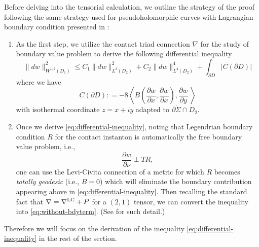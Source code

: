 \documentclass[reqno]{amsart}
\newcommand{\del}{\partial}
\newcommand{\be}{\begin{equation}}
\newcommand{\ee}{\end{equation}}
\theoremstyle{theorem}
\theoremstyle{definition}
\numberwithin{equation}{section}
\begin{document}
Before delving into the tensorial calculation, we outline the strategy of the proof
following the same strategy used for  pseudoholomorphic curves with Lagrangian boundary condition
presented in \cite[Section 8.2 \& 8.3]{oh:book1}:
\begin{enumerate}
\item As the first step, we utilize the contact triad connection $\nabla$ for the study of
boundary value problem to derive the following differential inequality
\be\label{eq:differential-inequality}
\|dw\|^2_{W^{1,2}(D_1)} \leq  C_1 \|dw\|^2_{L^2(D_2)} + C_2 \|dw\|^4_{L^4(D_2)}
+ \int_{\del D}|C(\del D)|
\ee
where we have
\be\label{eq;CdelD}
C(\del D): = - 8\left\langle B\left(\frac{\del w}{\del x},\frac{\del w}{\del x}\right),\frac{\del w}{\del y}\
\right \rangle
\ee
with isothermal coordinate $z = x+ iy$ adapted to $\del \dot \Sigma \cap D_2$.
\item Once we derive \eqref{eq:differential-inequality}, noting that Legendrian boundary
condition $R$ for the contact instanton is automatically the free boundary value problem, i.e.,
$$
\frac{\del w}{\del \nu} \perp TR,
$$
one can use the Levi-Civita connection of a metric for which $R$ becomes
\emph{totally geodesic} (i.e., $B=0$) which will eliminate the boundary contribution
appearing above in \eqref{eq:differential-inequality}. Then recalling the standard fact
that $\nabla = \nabla^{\text{\rm LC}} + P$ for a $(2,1)$ tensor, we can convert the inequality
into \eqref{eq:without-bdyterm}. (See \cite[Section 8.3]{oh:book1} for such detail.)
\end{enumerate}

Therefore we will focus on the derivation of the inequality \eqref{eq:differential-inequality}
in the rest of the section.
\end{document}
